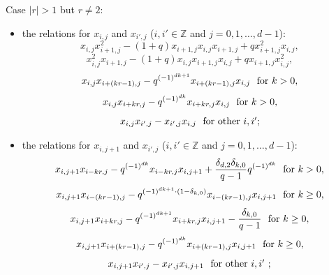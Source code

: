 \documentclass[reqno,12pt,a4paper]{amsart}
\theoremstyle{remark}
\theoremstyle{definition}
\numberwithin{equation}{section}
\begin{document}
\smallskip
\noindent Case $|r|>1$ but $r\neq2$:
\begin{itemize}
   \item[(1)] the relations for $x_{i,j}$ and $x_{i',j}$ ($i,i'\in\mathbb{Z}$ and $j=0,1,\ldots,d-1$):
  \begin{equation*}
    x_{i,j}x_{i+1,j}^2-(1+q)x_{i+1,j}x_{i,j}x_{i+1,j}+qx_{i+1,j}^2x_{i,j},
  \end{equation*}
  \begin{equation*}
   x_{i,j}^2x_{i+1,j}-(1+q)x_{i,j}x_{i+1,j}x_{i,j}+qx_{i+1,j}x_{i,j}^2,
  \end{equation*}
  \begin{equation*}
    x_{i,j}x_{i+(kr-1),j}-q^{(-1)^{dk+1}}x_{i+(kr-1),j}x_{i,j} ~\hbox{ for }k>0,
  \end{equation*}
  \begin{equation*}
    x_{i,j}x_{i+kr,j}-q^{(-1)^{dk}}x_{i+kr,j}x_{i,j} ~\hbox{ for }k>0,
  \end{equation*}
  \begin{equation}\label{relation:commutative-in-the-same-piece}
    x_{i,j}x_{i',j}-x_{i',j}x_{i,j} ~\hbox{ for other $i, i'$};
  \end{equation}




\item[(2)] the relations for $x_{i,j+1}$ and $x_{i',j}$ ($i,i'\in\mathbb{Z}$ and $j=0,1,\ldots,d-1$):
  \begin{equation*}
  x_{i,j+1}x_{i-kr,j}-q^{(-1)^{dk}}x_{i-kr,j}x_{i,j+1}+\frac{\delta_{d,2}\delta_{k,0}}{q-1}q^{(-1)^{dk}} ~\hbox{ for } k>0,
  \end{equation*}
    \begin{equation*}
    x_{i,j+1}x_{i-(kr-1),j}-q^{(-1)^{dk+1}\cdot (1-\delta_{k,0})}x_{i-(kr-1),j}x_{i,j+1} ~\hbox{ for } k\geq0,
  \end{equation*}
  \begin{equation*}
    x_{i,j+1}x_{i+kr,j}-q^{(-1)^{dk+1}}x_{i+kr,j}x_{i,j+1}-\frac{\delta_{k,0}}{q-1} ~\hbox{ for } k\geq0,
  \end{equation*}
  \begin{equation*}
   x_{i,j+1}x_{i+(kr-1),j}-q^{(-1)^{dk}}x_{i+(kr-1),j}x_{i,j+1} ~\hbox{ for } k\geq0,
  \end{equation*}
  \begin{equation}\label{relation:commutative-in-the-neighbour-pieces}
    x_{i,j+1}x_{i',j}-x_{i',j}x_{i,j+1} ~\hbox{ for other $i, i'$ };
  \end{equation}




\end{itemize}
\end{document}
